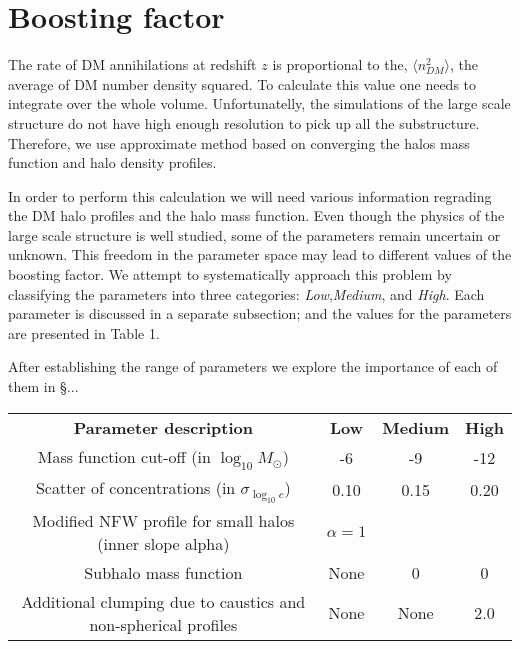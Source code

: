 \section{Boosting factor}
\label{sec:boosting}

The rate of DM annihilations at redshift $z$ is proportional to the, $\langle n_{DM}^2 \rangle$, the average of DM number density squared. To calculate this value one needs to integrate over the whole volume. Unfortunatelly, the simulations of the large scale structure do not have high enough resolution to pick up all the substructure. Therefore, we use approximate method based on converging the halos mass function and halo density profiles.

In order to perform this calculation we will need various information regrading the DM halo profiles and the halo mass function. Even though the physics of the large scale structure is well studied, some of the parameters remain uncertain or unknown. This freedom in the parameter space may lead to different values of the boosting factor. We attempt to systematically approach this problem by classifying the parameters into three categories: \textit{Low},\textit{Medium}, and \textit{High}. Each parameter is discussed in a separate subsection; and the values for the parameters are presented in Table 1.

After establishing the range of parameters we explore the importance of each of them in \S ... 

\begin{table}
    \begin{tabular}{ c c c c }
    \textbf{Parameter description}                                    & \textbf{Low} & \textbf{Medium} & \textbf{High} \hline \hline \\
    Mass function cut-off (in $\log_{10}M_\odot$)        & -6 & -9 & -12 \\
    Scatter of concentrations (in $\sigma_{\log_{10}c}$)              & 0.10 & 0.15 & 0.20 \\
    Modified NFW profile for small halos (inner slope alpha) & $\alpha=1$ & \cite{Ishiyama_2014} &  \cite{Ishiyama_2014} \\
    Subhalo mass function & None & 0 & 0 \\
    Additional clumping due to caustics and non-spherical profiles & None & None & 2.0
\\    \end{tabular}
\end{table}
